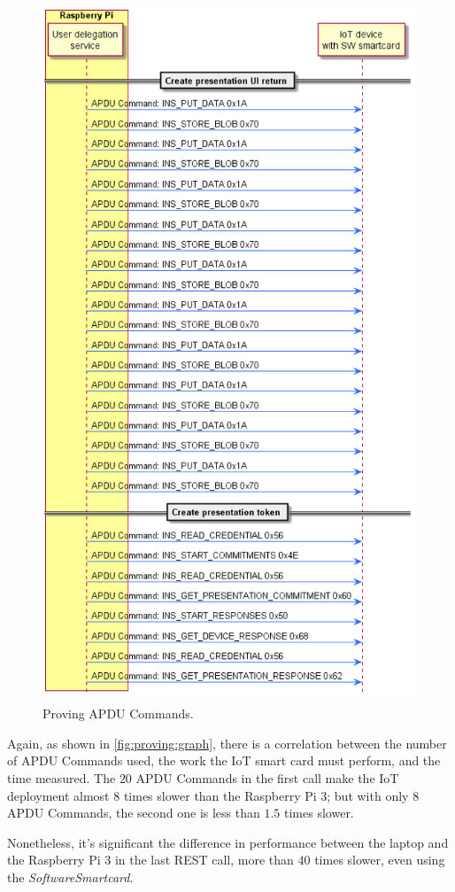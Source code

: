 \begin{figure}[bth]
	\begin{center}
		\includegraphics[width=0.7\linewidth]{gfx/APDUsProving}
	\end{center}
	\caption{Proving APDU Commands.}
	\label{fig:APDUsProving}
\end{figure}


Again, as shown in \autoref{fig:proving:graph}, there is a correlation between the number of APDU Commands used, the work the IoT smart card must perform, and the time measured. The $20$ APDU Commands in the first call make the IoT deployment almost $8$ times slower than the Raspberry Pi 3; but with only $8$ APDU Commands, the second one is less than $1.5$ times slower.

Nonetheless, it's significant the difference in performance between the laptop and the Raspberry Pi 3 in the last REST call, more than $40$ times slower, even using the \textit{SoftwareSmartcard}.


